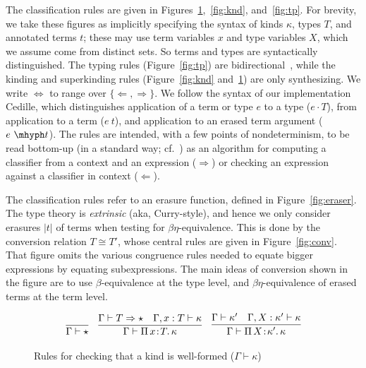 \documentclass{article}
\newcommand{\abs}[4]{{#1}\, #2\! : \! #3.\, #4}
\newcommand{\tpcheck}[0]{\Leftarrow}
\newcommand{\tpsynth}[0]{\Rightarrow}
\begin{document}
The classification rules are given in
Figures~\ref{fig:superknd},~\ref{fig:knd}, and~\ref{fig:tp}.  For
brevity, we take these figures as implicitly specifying the syntax of
kinds $\kappa$, types $T$, and annotated terms $t$; these may use term
variables $x$ and type variables $X$, which we assume come from
distinct sets.  So terms and types are syntactically distinguished.
The typing rules (Figure~\ref{fig:tp}) are
bidirectional~\cite{pierce+00}, while the kinding and superkinding
rules (Figure~\ref{fig:knd} and~\ref{fig:superknd}) are only
synthesizing.  We write $\Leftrightarrow$ to range over
$\{\tpcheck,\tpsynth\}$. We follow the syntax of our implementation
Cedille, which distinguishes application of a term or type $e$ to a
type ($e \cdot T$), from application to a term ($e\ t$), and
application to an erased term argument ($e\ \mhyph t$).  The rules are
intended, with a few points of nondeterminism, to be read bottom-up
(in a standard way; cf.~\cite{peytonjones07}) as an algorithm for
computing a classifier from a context and an expression ($\tpsynth$)
or checking an expression against a classifier in context
($\tpcheck$).

The classification rules refer to an erasure function, defined in
Figure~\ref{fig:eraser}.  The type theory is \emph{extrinsic} (aka,
Curry-style), and hence we only consider erasures $|t|$ of terms when
testing for $\beta\eta$-equivalence.  This is done by the conversion
relation $T\cong T'$, whose central rules are given in
Figure~\ref{fig:conv}.  That figure omits the various congruence rules
needed to equate bigger expressions by equating subexpressions.  The
main ideas of conversion shown in the figure are to use
$\beta$-equivalence at the type level, and $\beta\eta$-equivalence of
erased terms at the term level.


\begin{figure}
  \[
  \begin{array}{llll}
    \infer{\Gamma \vdash \star}{\ } &
    \infer{\Gamma\vdash\abs{\Pi}{x}{T}{\kappa}}{\Gamma \vdash T \tpsynth \star & \Gamma,x:T\vdash\kappa} &
    \infer{\Gamma\vdash\abs{\Pi}{X}{\kappa'}{\kappa}}{\Gamma \vdash \kappa' & \Gamma,X:\kappa'\vdash\kappa}
  \end{array}
  \]
  \caption{Rules for checking that a kind is well-formed ($\Gamma \vdash \kappa$)}
  \label{fig:superknd}
\end{figure}
\end{document}
